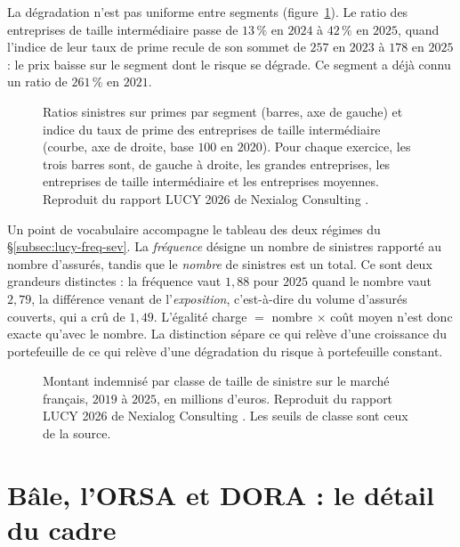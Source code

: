 \noindent La dégradation n'est pas uniforme entre segments (figure~\ref{fig:lucy-divergence}). Le
ratio des entreprises de taille intermédiaire passe de $13\,\%$ en $2024$ à $42\,\%$ en $2025$,
quand l'indice de leur taux de prime recule de son sommet de $257$ en $2023$ à $178$ en $2025$ :
le prix baisse sur le segment dont le risque se dégrade. Ce segment a déjà connu un ratio de
$261\,\%$ en $2021$.

\begin{figure}[htbp]
\centering
{}
\caption[Divergence entre prix et risque par segment]{Ratios sinistres sur primes par segment
(barres, axe de gauche) et indice du taux de prime des entreprises de taille intermédiaire
(courbe, axe de droite, base $100$ en $2020$). Pour chaque exercice, les trois barres sont, de
gauche à droite, les grandes entreprises, les entreprises de taille intermédiaire et les
entreprises moyennes. Reproduit du rapport LUCY 2026 de Nexialog Consulting
\citep{RapiorKaddouri2026}.}
\label{fig:lucy-divergence}
\end{figure}

\vspace{2pt}
\noindent Un point de vocabulaire accompagne le tableau des deux régimes du \S\ref{subsec:lucy-freq-sev}. La \emph{fréquence} désigne un nombre de
sinistres rapporté au nombre d'assurés, tandis que le \emph{nombre} de sinistres est un total. Ce
sont deux grandeurs distinctes : la fréquence vaut $1{,}88$ pour $2025$ quand le nombre vaut
$2{,}79$, la différence venant de l'\emph{exposition}, c'est-à-dire du volume d'assurés couverts,
qui a crû de $1{,}49$. L'égalité charge $=$ nombre $\times$ coût moyen n'est donc exacte qu'avec
le nombre. La distinction sépare ce qui relève d'une croissance du portefeuille de ce qui relève
d'une dégradation du risque à portefeuille constant.

\begin{figure}[htbp]
\centering
{}
\caption[Montant indemnisé par classe de taille de sinistre]{Montant indemnisé par classe de
taille de sinistre sur le marché français, $2019$ à $2025$, en millions d'euros. Reproduit du
rapport LUCY 2026 de Nexialog Consulting \citep{RapiorKaddouri2026}. Les seuils de classe sont
ceux de la source.}
\label{fig:lucy-taille}
\end{figure}

\section{Bâle, l'ORSA et DORA : le détail du cadre}
\label{sec:ann-reglementaire}

